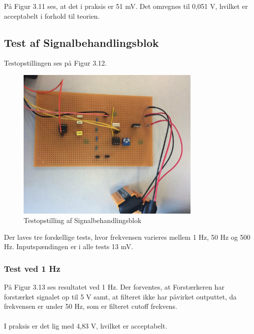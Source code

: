På Figur 3.11 ses, at det i praksis er 51 mV. Det omregnes til 0,051 V, hvilket er acceptabelt i forhold til teorien. 

\subsection{Test af Signalbehandlingsblok}

Testopstillingen ses på Figur 3.12. 

\begin{figure}[H]
	\centering
	\includegraphics[width=0.8\textwidth]{Figurer/Snip20151207_46}
	\caption{Testopstilling af Signalbehandlingsblok}
	\label{fig:Signalsbehanlding}
\end{figure}

Der laves tre forskellige tests, hvor frekvensen varieres mellem 1 Hz, 50 Hz og 500 Hz. Inputspændingen er i alle tests 13 mV. 
\\
\subsubsection{Test ved 1 Hz}
På Figur 3.13 ses resultatet ved 1 Hz. Der forventes, at Forstærkeren har forstærket signalet op til 5 V samt, at filteret ikke har påvirket outputtet, da frekvensen er under 50 Hz, som er filteret cutoff frekvens.
\\ \\
I praksis er det lig med 4,83 V, hvilket er acceptabelt.  
 
